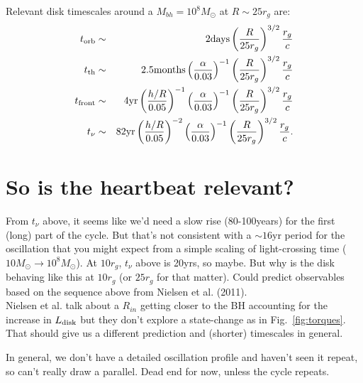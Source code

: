\documentclass[12pt]{article}
\begin{document}
Relevant disk timescales around a $M_{bh}=10^{8}M_{\odot}$ at $R\sim 25r_{g}$ are:
\begin{eqnarray}
t_{\rm orb} & \sim & 2{\rm days} \left(\frac{R}{25r_{g}}\right)^{3/2} \frac{r_{g}}{c}\\
t_{\rm th} & \sim & 2.5{\rm months} \left(\frac{\alpha}{0.03}\right)^{-1}\left(\frac{R}{25r_{g}}\right)^{3/2} \frac{r_{g}}{c}\\
t_{\rm front} & \sim & 4{\rm yr} \left(\frac{h/R}{0.05}\right)^{-1}\left(\frac{\alpha}{0.03}\right)^{-1}\left(\frac{R}{25r_{g}}\right)^{3/2} \frac{r_{g}}{c}\\
t_{\nu} & \sim & 82{\rm yr} \left(\frac{h/R}{0.05}\right)^{-2}\left(\frac{\alpha}{0.03}\right)^{-1}\left(\frac{R}{25r_{g}}\right)^{3/2} \frac{r_{g}}{c}.
\end{eqnarray}

\section{So is the heartbeat relevant?}
From $t_{\nu}$ above, it seems like we'd need a slow rise (80-100years) for the first (long) part of the cycle. But that's not consistent with a $\sim 16$yr period for the oscillation that you might expect from a simple scaling of light-crossing time ($10M_{\odot} \rightarrow 10^{8}M_{\odot}$). At $10r_{g}$, $t_{\nu}$ above is 20yrs, so maybe. But why is the disk behaving like this at $10r_{g}$ (or $25r_{g}$ for that matter). 
Could predict observables based on the sequence above from Nielsen et al. (2011).\\
 Nielsen et al. talk about a $R_{in}$ getting closer to the BH accounting for the increase in $L_{\rm  disk}$ but they don't explore a state-change as in Fig.~\ref{fig:torques}. That should give us a different prediction  and (shorter) timescales in general. 

In general, we don't have a detailed oscillation profile and haven't seen it repeat, so can't really draw a parallel. Dead end for now, unless the cycle repeats.
\end{document}
